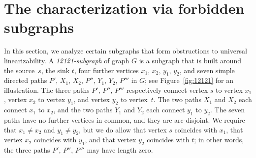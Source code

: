 \medskip
\section{The characterization via forbidden subgraphs}
\label{sec:forbidden}
In this section, we analyze certain subgraphs that form obstructions to universal linearizability.
A \emph{12121-subgraph} of graph $G$ is a subgraph that is built around the source~$s$, the sink $t$, 
four further vertices $x_1$, $x_2$, $y_1$, $y_2$, and seven simple directed paths $P'$, $X_1$, 
$X_2$, $P''$, $Y_1$, $Y_2$, $P'''$ in $G$; see Figure~\ref{fig:12121} for an illustration.
The three paths $P'$, $P''$, $P'''$ respectively connect vertex $s$ to vertex $x_1$,
vertex $x_2$ to vertex $y_1$, and vertex $y_2$ to vertex~$t$.
The two paths $X_1$ and $X_2$ each connect $x_1$ to $x_2$, and
the two paths $Y_1$ and $Y_2$ each connect $y_1$ to $y_2$.
The seven paths have no further vertices in common, and they are arc-disjoint.
We require that $x_1\ne x_2$ and $y_1\ne y_2$, but we do allow that vertex $s$ coincides with $x_1$, 
that vertex $x_2$ coincides with $y_1$, and that vertex $y_2$ coincides with $t$; 
in other words, the three paths $P'$, $P''$, $P'''$ may have length zero.

